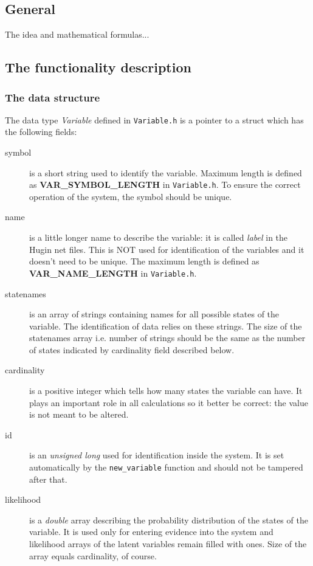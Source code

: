 \documentclass[12pt,a4paper]{report}
\begin{document}
\subsection{General}

The idea and mathematical formulas...

\subsection{The functionality description}

\subsubsection{The data structure}
The data type {\it Variable} defined in \verb+Variable.h+ is a pointer 
to a struct which has the following fields: 
\begin{description}
\item[symbol] is a short string used to identify the variable. Maximum
length is defined as \textbf{VAR\_SYMBOL\_LENGTH} in
\verb+Variable.h+. To ensure the correct operation of the system, the 
symbol should be unique.

\item[name] is a little longer name to describe the variable: it is
called {\it label} in the Hugin net files. This is NOT used for 
identification of the variables and it doesn't need to be unique. 
The maximum length is defined as \textbf{VAR\_NAME\_LENGTH} in 
\verb+Variable.h+.

\item[statenames] is an array of strings containing names for all
possible states of the variable. The identification of data relies on
these strings. The size of the statenames array i.e. number of
strings should be the same as the number of states indicated by
cardinality field described below.

\item[cardinality] is a positive integer which tells how many states
the variable can have. It plays an important role in all calculations
so it better be correct: the value is not meant to be altered.

\item[id] is an {\it unsigned long} used for identification inside the
system. It is set automatically by the \verb+new_variable+ function
and should not be tampered after that.

\item[likelihood] is a {\it double} array describing the probability
distribution of the states of the variable. It is used only for
entering evidence into the system and likelihood arrays of the latent
variables remain filled with ones. Size of the array equals
cardinality, of course.


\end{description}
\end{document}
